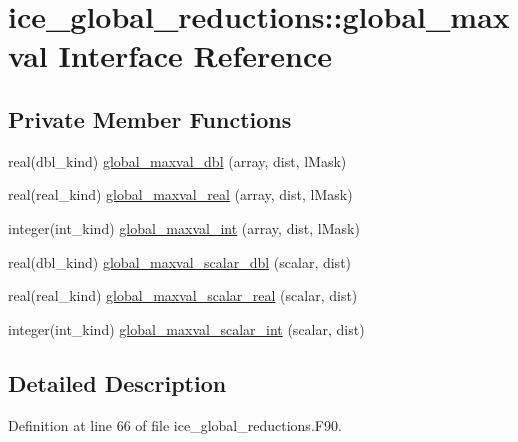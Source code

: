 \hypertarget{interfaceice__global__reductions_1_1global__maxval}{
\section{ice\_\-global\_\-reductions::global\_\-maxval Interface Reference}
\label{interfaceice__global__reductions_1_1global__maxval}
}
\subsection*{Private Member Functions}
\begin{DoxyCompactItemize}
\item 
real(dbl\_\-kind) \hyperlink{interfaceice__global__reductions_1_1global__maxval_a4a852ac21171141c89954b1c8fe1e2d1}{global\_\-maxval\_\-dbl} (array, dist, lMask)
\item 
real(real\_\-kind) \hyperlink{interfaceice__global__reductions_1_1global__maxval_ae05c6bf55e813e8628ab93fc277da7fd}{global\_\-maxval\_\-real} (array, dist, lMask)
\item 
integer(int\_\-kind) \hyperlink{interfaceice__global__reductions_1_1global__maxval_a908c45ec48e81cd70fdbc878f1c9864d}{global\_\-maxval\_\-int} (array, dist, lMask)
\item 
real(dbl\_\-kind) \hyperlink{interfaceice__global__reductions_1_1global__maxval_a6db43b036b9497a6c00d987cd1677207}{global\_\-maxval\_\-scalar\_\-dbl} (scalar, dist)
\item 
real(real\_\-kind) \hyperlink{interfaceice__global__reductions_1_1global__maxval_a47b1976a64d47a897e2347bbe20a72bd}{global\_\-maxval\_\-scalar\_\-real} (scalar, dist)
\item 
integer(int\_\-kind) \hyperlink{interfaceice__global__reductions_1_1global__maxval_a9af5e401da9ac005625d02bf3cecebc1}{global\_\-maxval\_\-scalar\_\-int} (scalar, dist)
\end{DoxyCompactItemize}


\subsection{Detailed Description}


Definition at line 66 of file ice\_\-global\_\-reductions.F90.

